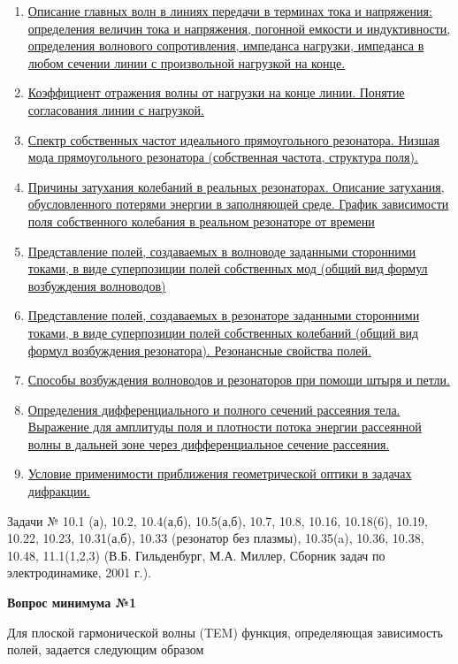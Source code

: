 \documentclass[a4paper,14pt]{extarticle}
\newcommand{\ticket}[1] {
\newpage
\hypertarget{num#1}{}
\begin{center}
	\textbf{Вопрос минимума №#1 }
\end{center}
}
\begin{document}
\begin{enumerate}
		\item
		\hyperlink{num9}{Описание главных волн в линиях передачи в терминах тока и напряжения: определения величин тока и напряжения, погонной емкости и индуктивности, \underline{определения} волнового сопротивления, импеданса нагрузки, импеданса в любом сечении линии с произвольной нагрузкой на конце.}
		\item 
		\hyperlink{num10}{Коэффициент отражения волны от нагрузки на конце линии. Понятие согласования линии с нагрузкой.}
		\item 
		\hyperlink{num11}{Спектр собственных частот идеального прямоугольного резонатора. Низшая мода прямоугольного резонатора (собственная частота, структура поля).}
		\item 
		\hyperlink{num12}{Причины затухания колебаний в реальных резонаторах. Описание затухания, обусловленного потерями энергии в заполняющей среде. График зависимости поля собственного колебания в реальном резонаторе от времени}
		\item 
		\hyperlink{num13}{Представление полей, создаваемых в волноводе заданными сторонними токами, в виде суперпозиции полей собственных мод (общий вид формул возбуждения волноводов)}
		\item 
		\hyperlink{num14}{Представление полей, создаваемых в резонаторе заданными сторонними токами, в виде суперпозиции полей собственных колебаний (общий вид формул возбуждения резонатора). Резонансные свойства полей.}
		\item 
		\hyperlink{num15}{Способы возбуждения волноводов и резонаторов при помощи штыря и петли.}
		\item 
		\hyperlink{num16}{Определения дифференциального и полного сечений рассеяния тела. Выражение для амплитуды поля и плотности потока энергии рассеянной волны в дальней зоне через дифференциальное сечение рассеяния.}
		\item 
		\hyperlink{num17}{Условие применимости приближения геометрической оптики в задачах дифракции.}
		
	\end{enumerate}
	
	Задачи № 10.1 (а), 10.2, 10.4(а,б), 10.5(а,б), 10.7, 10.8, 10.16, 10.18(6), 10.19, 10.22, 10.23, 10.31(а,б), 10.33 (резонатор без плазмы), 10.35(a), 10.36, 10.38, 10.48, 11.1(1,2,3)
	(В.Б. Гильденбург, М.А. Миллер, Сборник задач по электродинамике, 2001 г.).

	\ticket{1}
	Для плоской гармонической волны (TEM) функция, определяющая зависимость полей, задается следующим образом 
	
\end{document}
